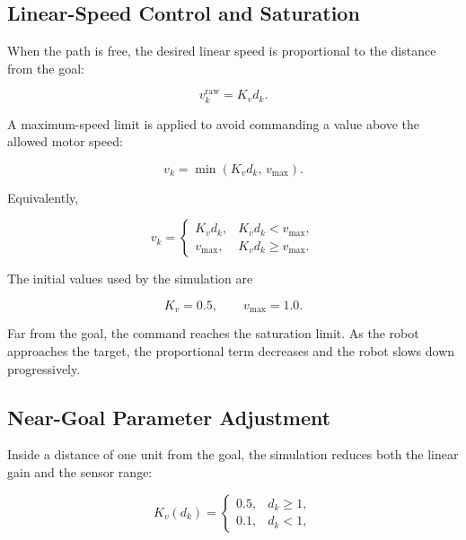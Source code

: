 \documentclass[10pt,twocolumn,a4paper]{article}
\begin{document}
\subsection{Linear-Speed Control and Saturation}

When the path is free, the desired linear speed is proportional to the
distance from the goal:

\begin{equation}
    v_k^{\mathrm{raw}}=K_v d_k.
    \label{eq:raw_linear_speed}
\end{equation}

A maximum-speed limit is applied to avoid commanding a value above the
allowed motor speed:

\begin{equation}
    v_k
    =
    \min\left(K_vd_k,\,v_{\max}\right).
    \label{eq:saturated_linear_speed}
\end{equation}

Equivalently,

\begin{equation}
    v_k=
    \begin{cases}
        K_vd_k, & K_vd_k<v_{\max},\\[1mm]
        v_{\max}, & K_vd_k\geq v_{\max}.
    \end{cases}
    \label{eq:piecewise_speed}
\end{equation}

The initial values used by the simulation are

\[
    K_v=0.5,
    \qquad
    v_{\max}=1.0.
\]

Far from the goal, the command reaches the saturation limit. As the
robot approaches the target, the proportional term decreases and the
robot slows down progressively.

\subsection{Near-Goal Parameter Adjustment}

Inside a distance of one unit from the goal, the simulation reduces both
the linear gain and the sensor range:

\begin{equation}
    K_v(d_k)=
    \begin{cases}
        0.5, & d_k\geq 1,\\
        0.1, & d_k<1,
    \end{cases}
    \label{eq:gain_schedule}
\end{equation}
\end{document}
